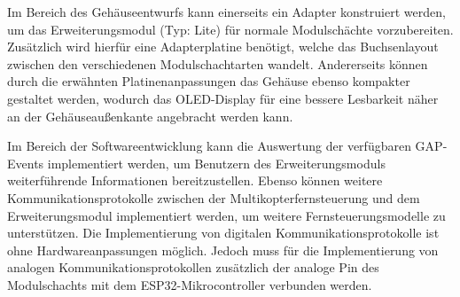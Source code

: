Im Bereich des Gehäuseentwurfs kann einerseits ein Adapter konstruiert werden, um das Erweiterungsmodul (Typ: Lite) für normale Modulschächte vorzubereiten. Zusätzlich wird hierfür eine Adapterplatine benötigt, welche das Buchsenlayout zwischen den verschiedenen Modulschachtarten wandelt. Andererseits können durch die erwähnten Platinenanpassungen das Gehäuse ebenso kompakter gestaltet werden, wodurch das \acs{OLED}-Display für eine bessere Lesbarkeit näher an der Gehäuseaußenkante angebracht werden kann.

Im Bereich der Softwareentwicklung kann die Auswertung der verfügbaren \ac{GAP}-Events implementiert werden, um Benutzern des Erweiterungsmoduls weiterführende Informationen bereitzustellen. Ebenso können weitere Kommunikationsprotokolle zwischen der Multikopterfernsteuerung und dem Erweiterungsmodul implementiert werden, um weitere Fernsteuerungsmodelle zu unterstützen. Die Implementierung von digitalen Kommunikationsprotokolle ist ohne Hardwareanpassungen möglich. Jedoch muss für die Implementierung von analogen Kommunikationsprotokollen zusätzlich der analoge Pin des Modulschachts mit dem ESP32-Mikrocontroller verbunden werden.